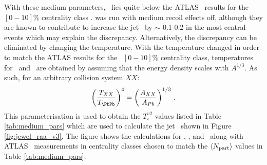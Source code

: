 

With these medium parameters, \jewel\ lies quite below the ATLAS \RAA\ results for the \PbPb\ $[0-10]\%$ centrality class \cite{Aaboud:2018twu}. \jewel was run with medium recoil effects off, although they are known to contribute to increase the jet \RAA\ by $\sim$ 0.1-0.2 in the most central events \cite{KunnawalkamElayavalli:2017hxo} which may explain the discrepancy. Alternatively, the discrepancy can be eliminated by changing the temperature.  With the temperature changed in order to match the ATLAS results for the \PbPb\ $[0-10]\%$ centrality class, temperatures for \XeXe\ and \ArAr\ are obtained by assuming that the energy density scales with $A^{1/3}$. As such, for an arbitrary collision system $XX$:
\begin{equation}
    \left( \frac{T_{XX}}{T_{\PbPb}} \right )^{4} = \left( \frac{A_{XX}}{A_{Pb}} \right)^{1/3} \, .
\end{equation}
This parameterisation is used to obtain the $T_i^{v2}$ values listed in Table \ref{tab:medium_pars} which are used to calculate the jet \RAA\ shown in Figure \ref{fig:jewel_raa_v3}.  The figure shows the \jewel calculations for \PbPb, \XeXe, and \ArAr\ along with ATLAS \PbPb\ measurements in centrality classes chosen to match the $\left\langle N_{\rm part} \right\rangle$ values in Table \ref{tab:medium_pars}.

